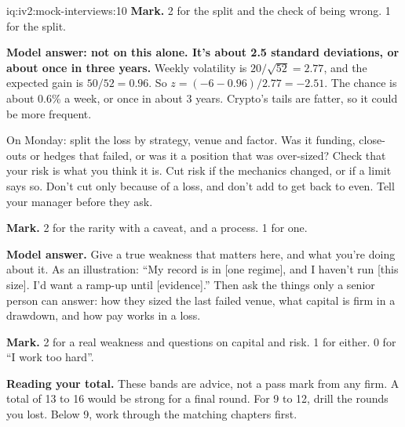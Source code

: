 \begin{solution}{iq:iv2:mock-interviews:10}
\textbf{Mark.} 2 for the split and the check of being wrong. 1 for the split.

\ivstop
\textbf{Model answer: not on this alone. It's about 2.5 standard deviations, or about once in three years.} Weekly volatility is $20/\sqrt{52} = 2.77$, and the expected gain is $50/52 = 0.96$. So $z = (-6 - 0.96)/2.77 = -2.51$. The chance is about 0.6\% a week, or once in about 3 years. Crypto's tails are fatter, so it could be more frequent.

On Monday: split the loss by strategy, venue and factor. Was it funding, close-outs or hedges that failed, or was it a position that was over-sized? Check that your risk is what you think it is. Cut risk if the mechanics changed, or if a limit says so. Don't cut only because of a loss, and don't add to get back to even. Tell your manager before they ask.

\textbf{Mark.} 2 for the rarity with a caveat, and a process. 1 for one.

\ivstop
\textbf{Model answer.} Give a true weakness that matters here, and what you're doing about it. As an illustration: ``My record is in [one regime], and I haven't run [this size]. I'd want a ramp-up until [evidence].'' Then ask the things only a senior person can answer: how they sized the last failed venue, what capital is firm in a drawdown, and how pay works in a loss.

\textbf{Mark.} 2 for a real weakness and questions on capital and risk. 1 for either. 0 for ``I work too hard''.

\medskip
\textbf{Reading your total.} These bands are advice, not a pass mark from any firm. A total of 13 to 16 would be strong for a final round. For 9 to 12, drill the rounds you lost. Below 9, work through the matching chapters first.

\end{solution}
